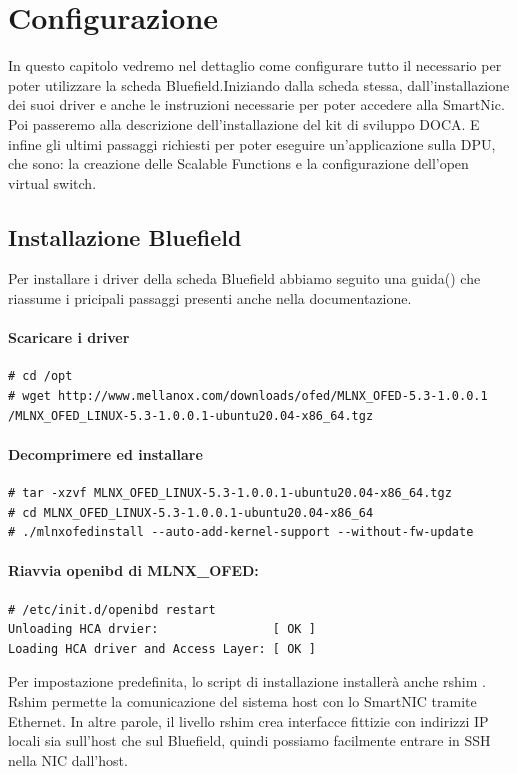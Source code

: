 \documentclass[binding=0.6cm]{sapthesis}
\theoremstyle{definition}
\begin{document}
\chapter{Configurazione}

In questo capitolo vedremo nel dettaglio come configurare tutto il necessario per poter 
utilizzare la scheda Bluefield.Iniziando dalla scheda stessa, dall'installazione dei suoi driver
e anche le instruzioni necessarie per poter accedere alla SmartNic.
Poi passeremo alla descrizione dell'installazione del kit di sviluppo DOCA.
E infine gli ultimi passaggi richiesti per poter eseguire un'applicazione sulla DPU, che sono:
la creazione delle Scalable Functions e la configurazione dell'open virtual switch.
\section{Installazione Bluefield}
Per installare i driver della scheda Bluefield abbiamo seguito una guida(\cite{install bluefield }) che riassume i 
pricipali passaggi presenti anche nella documentazione.
\subsubsection*{Scaricare i driver}
\begin{verbatim}
# cd /opt   
# wget http://www.mellanox.com/downloads/ofed/MLNX_OFED-5.3-1.0.0.1
/MLNX_OFED_LINUX-5.3-1.0.0.1-ubuntu20.04-x86_64.tgz
\end{verbatim}
\subsubsection*{Decomprimere ed installare} 

\begin{verbatim}
# tar -xzvf MLNX_OFED_LINUX-5.3-1.0.0.1-ubuntu20.04-x86_64.tgz 
# cd MLNX_OFED_LINUX-5.3-1.0.0.1-ubuntu20.04-x86_64 
# ./mlnxofedinstall --auto-add-kernel-support --without-fw-update 
\end{verbatim}
\subsubsection*{Riavvia openibd di MLNX\_OFED: }
\begin{verbatim}
# /etc/init.d/openibd restart
Unloading HCA drvier:                [ OK ]
Loading HCA driver and Access Layer: [ OK ]
\end{verbatim}
Per impostazione predefinita, lo script di installazione installerà anche rshim .
Rshim permette la comunicazione del  sistema host  
con lo SmartNIC tramite Ethernet. In altre parole, il livello rshim crea interfacce
fittizie con indirizzi IP locali sia sull'host che sul Bluefield, quindi possiamo 
facilmente entrare in SSH nella NIC dall'host. 
\end{document}
